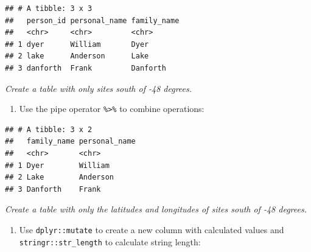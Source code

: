 \documentclass[]{Nemilov}
\newenvironment{Shaded}{\begin{snugshade}}{\end{snugshade}}
\newcommand{\DataTypeTok}[1]{\textcolor[rgb]{0.13,0.29,0.53}{#1}}
\newcommand{\KeywordTok}[1]{\textcolor[rgb]{0.13,0.29,0.53}{\textbf{#1}}}
\newcommand{\NormalTok}[1]{#1}
\newcommand{\OperatorTok}[1]{\textcolor[rgb]{0.81,0.36,0.00}{\textbf{#1}}}
\newcommand{\StringTok}[1]{\textcolor[rgb]{0.31,0.60,0.02}{#1}}
\providecommand{\tightlist}{%
  \setlength{\itemsep}{0pt}\setlength{\parskip}{0pt}}
\begin{document}
\begin{verbatim}
## # A tibble: 3 x 3
##   person_id personal_name family_name
##   <chr>     <chr>         <chr>      
## 1 dyer      William       Dyer       
## 2 lake      Anderson      Lake       
## 3 danforth  Frank         Danforth
\end{verbatim}

\emph{Create a table with only sites south of -48 degrees.}

\begin{enumerate}
\def\labelenumi{\arabic{enumi}.}
\setcounter{enumi}{7}
\tightlist
\item
  Use the pipe operator \texttt{\%\textgreater{}\%} to combine operations:
\end{enumerate}

\begin{Shaded}
\end{Shaded}

\begin{verbatim}
## # A tibble: 3 x 2
##   family_name personal_name
##   <chr>       <chr>        
## 1 Dyer        William      
## 2 Lake        Anderson     
## 3 Danforth    Frank
\end{verbatim}

\emph{Create a table with only the latitudes and longitudes of sites south of -48 degrees.}

\begin{enumerate}
\def\labelenumi{\arabic{enumi}.}
\setcounter{enumi}{8}
\tightlist
\item
  Use \texttt{dplyr::mutate} to create a new column with calculated values and \texttt{stringr::str\_length} to calculate string length:
\end{enumerate}

\begin{Shaded}
\end{Shaded}
\end{document}
